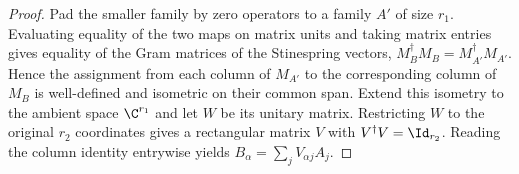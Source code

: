 \begin{proof}
    \leanok
    Pad the smaller family by zero operators to a family $A'$ of size $r_1$.
    Evaluating equality of the two maps on matrix units and taking matrix
    entries gives equality of the Gram matrices of the Stinespring vectors,
    $M_B^\dagger M_B=M_{A'}^\dagger M_{A'}$.  Hence the assignment from
    each column of $M_{A'}$ to the corresponding column of $M_B$ is
    well-defined and isometric on their common span.  Extend this isometry to
    the ambient space $\C^{r_1}$ and let $W$ be its unitary matrix.  Restricting
    $W$ to the original $r_2$ coordinates gives a rectangular matrix $V$ with
    $V^\dagger V=\Id_{r_2}$.  Reading the column identity entrywise yields
    $B_\alpha=\sum_jV_{\alpha j}A_j$.
\end{proof}
